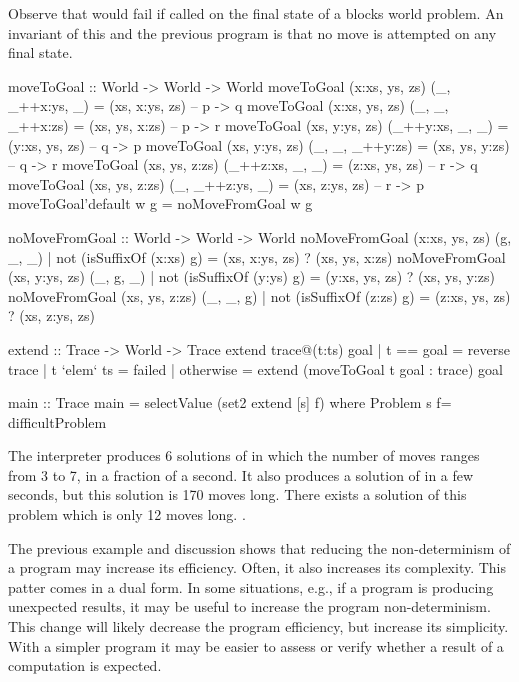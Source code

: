 Observe that  would fail if called on the
final state of a blocks world problem.  An invariant of this
and the previous program is that no move is attempted on any
final state.
%
\begin{curry}
moveToGoal :: World -> World -> World
moveToGoal (x:xs, ys, zs) (_, _++x:ys, _) = (xs, x:ys, zs) -- p -> q
moveToGoal (x:xs, ys, zs) (_, _, _++x:zs) = (xs, ys, x:zs) -- p -> r
moveToGoal (xs, y:ys, zs) (_++y:xs, _, _) = (y:xs, ys, zs) -- q -> p
moveToGoal (xs, y:ys, zs) (_, _, _++y:zs) = (xs, ys, y:zs) -- q -> r
moveToGoal (xs, ys, z:zs) (_++z:xs, _, _) = (z:xs, ys, zs) -- r -> q
moveToGoal (xs, ys, z:zs) (_, _++z:ys, _) = (xs, z:ys, zs) -- r -> p
moveToGoal'default w g = noMoveFromGoal w g

noMoveFromGoal :: World -> World -> World
noMoveFromGoal (x:xs, ys, zs) (g, _, _)
  | not (isSuffixOf (x:xs) g) = (xs, x:ys, zs) ? (xs, ys, x:zs)
noMoveFromGoal (xs, y:ys, zs) (_, g, _)
  | not (isSuffixOf (y:ys) g) = (y:xs, ys, zs) ? (xs, ys, y:zs)
noMoveFromGoal (xs, ys, z:zs) (_, _, g)
  | not (isSuffixOf (z:zs) g) = (z:xs, ys, zs) ? (xs, z:ys, zs)

extend :: Trace -> World -> Trace
extend trace@(t:ts) goal
  | t == goal    = reverse trace
  | t `elem` ts  = failed
  | otherwise    = extend (moveToGoal t goal : trace) goal

main :: Trace
main = selectValue (set2 extend [s] f) 
     where Problem s f= difficultProblem
\end{curry}
%
The \pakcs{} interpreter produces 6 solutions of 
in which the number of moves ranges from 3 to 7, in a fraction of a second.
It also produces a solution of  in a few
seconds, but this solution is 170 moves long.  There exists a
solution of this problem which is only 12 moves long.
.

The previous example and discussion shows that reducing the
non-determinism of a program may increase its efficiency.  Often, it
also increases its complexity. This patter comes in a dual form.
In some situations, e.g., if a program is producing unexpected
results, it may be useful to increase the program non-determinism.
This change will likely decrease the program efficiency,
but increase its simplicity.  With a simpler program it
may be easier to assess or verify whether a result of a computation
is expected.

